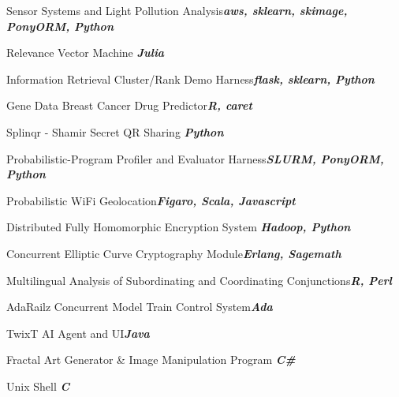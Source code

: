 \documentclass{article}
\newenvironment{**mylist}[2]{
  \subsubsection*{#1\hfill\small#2}
  \small
  \begin{list}{}{}
   \setlength{\topsep}{0pt}
   \setlength{\itemsep}{1pt}
   \setlength{\parskip}{0pt}
   \setlength{\parsep}{0pt}}{\end{list}\normalsize}
\newcommand{\LUx}[1]{{\bf\em #1}}
\begin{document}
\small
\vspace{-.08in}\begin{**mylist}{}{}
\item Sensor Systems and Light Pollution Analysis\hfill\LUx{aws, sklearn, skimage, PonyORM, Python}
\item Relevance Vector Machine \hfill\LUx{Julia}
\item Information Retrieval Cluster/Rank Demo Harness\hfill\LUx{flask, sklearn, Python}
\item Gene Data Breast Cancer Drug Predictor\hfill\LUx{R, caret}
\item Splinqr - Shamir Secret QR Sharing \hfill\LUx{Python}
\item Probabilistic-Program Profiler and Evaluator Harness\hfill\LUx{SLURM, PonyORM, Python}
\item Probabilistic WiFi Geolocation\hfill\LUx{Figaro, Scala, Javascript}
\item Distributed Fully Homomorphic Encryption System \hfill\LUx{Hadoop, Python}
\item Concurrent Elliptic Curve Cryptography Module\hfill\LUx{Erlang, Sagemath}
\item Multilingual Analysis of Subordinating and Coordinating Conjunctions\hfill\LUx{R, Perl}
\item AdaRailz Concurrent Model Train Control System\hfill\LUx{Ada}
\item TwixT AI Agent and UI\hfill\LUx{Java}
\item Fractal Art Generator \& Image Manipulation Program \hfill\LUx{C\#}
\item Unix Shell \hfill\LUx{C}
\end{**mylist}
\normalsize
\end{document}
